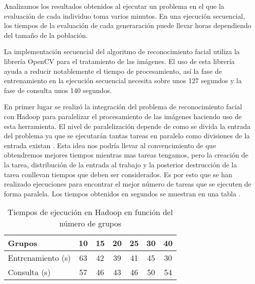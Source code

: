 \label{resultados-facerecognition}

Analizamos los resultados obtenidos al ejecutar un problema en el que la evaluación de cada individuo toma varios minutos. En una ejecuci\'on secuencial, los tiempos de la evaluación de cada generaraci\'on puede llevar horas dependiendo del tamaño de la población.

La implementaci\'on secuencial del algoritmo de reconocimiento facial utiliza la librer\'ia OpenCV para el tratamiento de las im\'agenes. El uso de esta librer\'ia ayuda a reducir notablemente el tiempo de procesamiento, as\'i la fase de entrenamiento en la ejecuci\'on secuencial necesita sobre unos 127 segundos y la fase de consulta unos 140 segundos. 

En primer lugar se realiz\'o la integraci\'on del problema de reconocimiento facial con Hadoop para paralelizar el procesamiento de las im\'agenes haciendo uso de esta herramienta. El nivel de paralelizaci\'on depende de como se divida la entrada del problema ya que se ejecutar\'an tantas tareas en paralelo como divisiones de la entrada existan . Esta idea nos podr\'ia llevar al convencimiento de que obtendremos mejores tiempos mientras mas tareas tengamos, pero la creaci\'on de la tarea, distribuci\'on de la entrada al trabajo y la posterior destrucci\'on de la tarea conllevan tiempos que deben ser considerados. Es por esto que se han realizado ejecuciones para encontrar el mejor n\'umero de tareas que se ejecuten de forma paralela. Los tiempos obtenidos en segundos se muestran en una tabla .

\begin{table}[H]
  \begin{center}
    \begin{center}
    \begin{tabular}{l | c c c c c c}
    Grupos & 10 & 15 & 20 & 25 & 30 & 40 \\ \hline
    Entrenamiento (s) & 63 & 42 & 39 & 41 & 45 & 30\\
    Consulta (s) & 57 & 46 & 43 & 46 & 50 & 54\\
    \end{tabular}
    \end{center}
    \caption{Tiempos de ejecución en Hadoop en funci\'on del n\'umero de grupos}
    \label{tabla-tiempos-num-grupos}
  \end{center}
\end{table}

